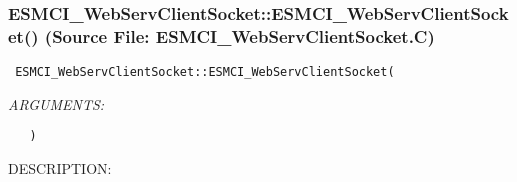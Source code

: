  
\setlength{\oldparskip}{\parskip}
\setlength{\parskip}{1.5ex}
\setlength{\oldparindent}{\parindent}
\setlength{\parindent}{0pt}
\setlength{\oldbaselineskip}{\baselineskip}
\setlength{\baselineskip}{11pt}
 
\def\bv{\begin{verbatim}}
\def\ev{\end{verbatim}}
\def\be{\begin{equation}}
\def\ee{\end{equation}}
\def\bea{\begin{eqnarray}}
\def\eea{\end{eqnarray}}
\def\bi{\begin{itemize}}
\def\ei{\end{itemize}}
\def\bn{\begin{enumerate}}
\def\en{\end{enumerate}}
\def\bd{\begin{description}}
\def\ed{\end{description}}
\def\({\left (}
\def\){\right )}
\def\[{\left [}
\def\]{\right ]}
\def\<{\left  \langle}
\def\>{\right \rangle}
\def\cI{{\cal I}}
\def\diag{\mathop{\rm diag}}
\def\tr{\mathop{\rm tr}}


 
\subsubsection{ESMCI\_WebServClientSocket::ESMCI\_WebServClientSocket() (Source File: ESMCI\_WebServClientSocket.C)}


  
\begin{verbatim} ESMCI_WebServClientSocket::ESMCI_WebServClientSocket(\end{verbatim}{\em ARGUMENTS:}
\begin{verbatim}   )\end{verbatim}
{\sf DESCRIPTION:\\ }


